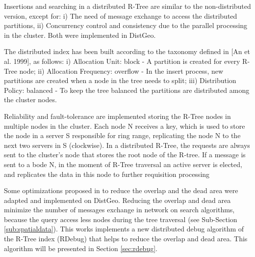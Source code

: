 Insertions and searching in a distributed R-Tree are similar to the non-distributed version, except for: i) The need of message exchange to access the distributed partitions, ii) Concurrency control and consistency due to the parallel processing in the cluster. Both were implemented in DistGeo.

	The distributed index has been built according to the taxonomy defined in [An et al. 1999], as follows: i) Allocation Unit: block - A partition is created for every R-Tree node; ii) Allocation Frequency: overflow - In the insert process, new partitions are created when a node in the tree needs to split; iii) Distribution Policy: balanced - To keep the tree balanced the partitions are distributed among the cluster nodes.
	
Reliability and fault-tolerance are implemented storing the R-Tree nodes in multiple nodes in the cluster. Each node N receives a key, which is used to store the node in a server S responsible for ring range, replicating the node N to the next two servers in S (clockwise). In a distributed R-Tree, the requests are always sent to the cluster's node that stores the root node of the R-tree. If a message is sent to a bode N, in the moment of R-Tree traversal an active server is elected, and replicates the data in this node to further requisition processing

	Some optimizations proposed in \cite{beckmann1990r} to reduce the overlap and the dead area were adapted and implemented on DistGeo. Reducing the overlap and dead area minimize the number of messages exchange in network on search algorithms, because the query access less nodes during the tree traversal (see Sub-Section \ref{sub:spatialdata}). This works implements a new distributed debug algorithm of the R-Tree index (RDebug) that helps to reduce the overlap and dead area. This algorithm will be presented in Section \ref{sec:rdebug}.